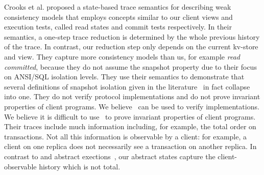 {%



Crooks et al. \citet{seebelieve} proposed a state-based trace
semantics for describing weak consistency models that employs concepts
similar to our client views and execution tests, called read states and
commit tests respectively.  In their semantics, a one-step trace
reduction is determined by the whole previous history of the trace.
In contrast, our reduction step only depends on the current kv-store
and view.  They capture more consistency models than us, for example  {\em
  read committed}, because they do not assume the snapshot property
due to their focus on ANSI/SQL isolation levels. They use their semantics to 
demonstrate that 
several definitions of snapshot isolation  given in the
literature~\cite{citations} in fact collapse into one.  They do not verify
protocol implementations and do not prove invariant properties of
client programs.  We believe~\cite{seebelieve} can be used to verify
implementations. We believe it is difficult to use~\cite{seebelieve}
to prove invariant properties of client programs.  Their 
traces include  much information including, for example,  the total
order on transactions. Not all this information is  observable by a
client: for example,  a client on one replica does not necessarily see
a transaction on another replica. In contrast to \cite{seebelieve} and abstract
exections~\cite{ev_transactions,framework-concur},  our abstract
states  capture the  client-observable history
which is not total. 





}
